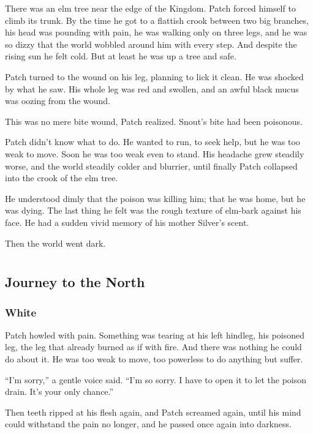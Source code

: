 \documentclass[ebook,oneside,openany,17pt]{memoir}
\newenvironment{tolerant}[1]{%
  \par\tolerance=#1\relax
}{%
  \par
}
\renewcommand{\thechapter}{\Roman{chapter}}
\newcounter{sections}
\newcommand{\sections}[1]{%
  \section*{#1}
  \addtocounter{sections}{1}%
  \pdfbookmark[1]{#1}{section.\thechapter.\thesections}}
\begin{document}
There was an elm tree near the edge of the Kingdom. Patch forced
himself to climb its trunk. By the time he got to a flattish crook
between two big branches, his head was pounding with pain, he was
walking only on three legs, and he was so dizzy that the world wobbled
around him with every step. And despite the rising sun he felt
cold. But at least he was up a tree and safe.

Patch turned to the wound on his leg, planning to lick it clean. He
was shocked by what he saw. His whole leg was red and swollen, and an
awful black mucus was oozing from the wound.

\begin{tolerant}{2000}
This was no mere bite wound, Patch realized. Snout’s bite had been
poisonous.
\end{tolerant}

Patch didn’t know what to do. He wanted to run, to seek help, but he
was too weak to move. Soon he was too weak even to stand. His headache
grew steadily worse, and the world steadily colder and blurrier, until
finally Patch collapsed into the crook of the elm tree.

\begin{tolerant}{2000}
He understood dimly that the poison was killing him; that he was home,
but he was dying. The last thing he felt was the rough texture of
elm-bark against his face. He had a sudden vivid memory of his mother
Silver’s scent.
\end{tolerant}

Then the world went dark.


\part{}

\chapter{Journey to the North}

\sections{White}

Patch howled with pain. Something was tearing at his left hindleg, his
poisoned leg, the leg that already burned as if with fire. And there
was nothing he could do about it. He was too weak to move, too
powerless to do anything but suffer.

“I’m sorry,” a gentle voice said. “I’m so sorry. I have to open it to
let the poison drain. It’s your only chance.”

Then teeth ripped at his flesh again, and Patch screamed again, until
his mind could withstand the pain no longer, and he passed once again
into darkness.
\end{document}
